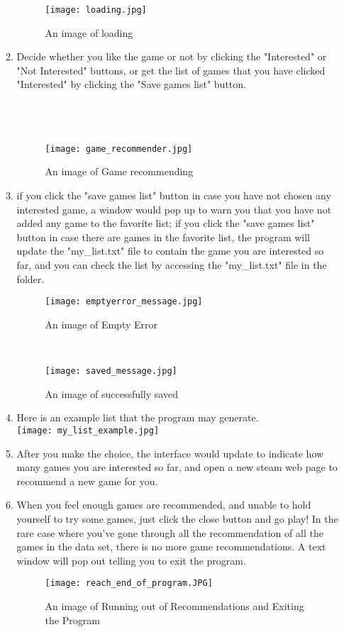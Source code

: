 \documentclass{article}
\begin{document}
\begin{itemize}
\begin{enumerate}
        \begin{figure}[htp]
            \centering
            \texttt{[image: loading.jpg]}
            \caption{An image of loading}
        \end{figure}
        \item Decide whether you like the game or not by clicking the "Interested" or "Not Interested" buttons, or get the list of games that you have clicked "Interested" by clicking the "Save games list" button.\\\\\\\\
        \begin{figure}[htp]
            \centering
            \texttt{[image: game\_recommender.jpg]}
            \caption{An image of Game recommending}
        \end{figure}
        \item if you click the "save games list" button in case you have not chosen any interested game, a window would pop up to warn you that you have not added any game to the favorite list; if you click the "save games list" button in case there are games in the favorite list, the program will update the "my\_list.txt" file to contain the game you are interested so far, and you can check the list by accessing the "my\_list.txt" file in the folder.
        \begin{figure}[htp]
            \centering
            \texttt{[image: emptyerror\_message.jpg]}
            \caption{An image of Empty Error}
        \end{figure}
        \\
        \begin{figure}[htp]
            \centering
            \texttt{[image: saved\_message.jpg]}
            \caption{An image of successfully saved}
        \end{figure}
        \item Here is an example list that the program may generate.\\
        \texttt{[image: my\_list\_example.jpg]}
        \item After you make the choice, the interface would update to indicate how many games you are interested so far, and open a new steam web page to recommend a new game for you.
        \item When you feel enough games are recommended, and unable to hold yourself to try some games, just click the close button and go play! In the rare case where you've gone through all the recommendation of all the games in the data set, there is no more game recommendations. A text window will pop out telling you to exit the program.
        \begin{figure}[htp]
            \centering
            \texttt{[image: reach\_end\_of\_program.JPG]}
            \caption{An image of Running out of Recommendations and Exiting the Program}
        \end{figure}
    \end{enumerate}
    \end{itemize}
\end{document}
